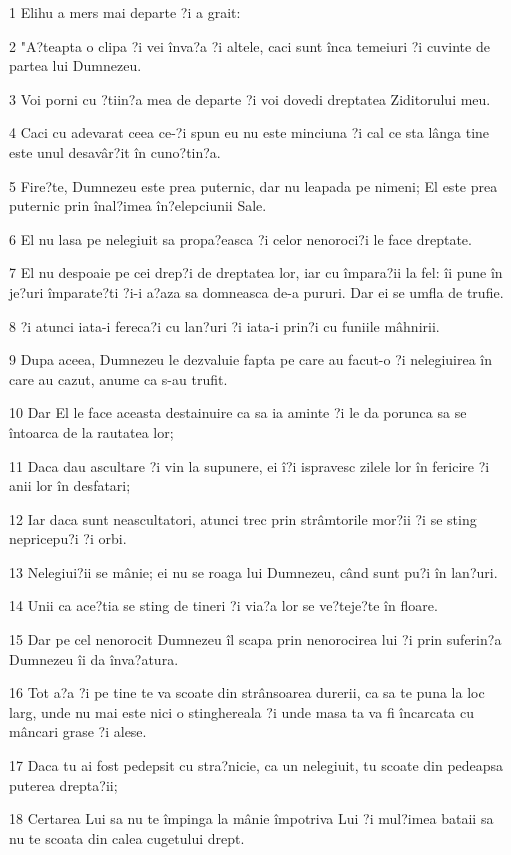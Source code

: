 \par 1 Elihu a mers mai departe ?i a grait:
\par 2 "A?teapta o clipa ?i vei înva?a ?i altele, caci sunt înca temeiuri ?i cuvinte de partea lui Dumnezeu.
\par 3 Voi porni cu ?tiin?a mea de departe ?i voi dovedi dreptatea Ziditorului meu.
\par 4 Caci cu adevarat ceea ce-?i spun eu nu este minciuna ?i cal ce sta lânga tine este unul desavâr?it în cuno?tin?a.
\par 5 Fire?te, Dumnezeu este prea puternic, dar nu leapada pe nimeni; El este prea puternic prin înal?imea în?elepciunii Sale.
\par 6 El nu lasa pe nelegiuit sa propa?easca ?i celor nenoroci?i le face dreptate.
\par 7 El nu despoaie pe cei drep?i de dreptatea lor, iar cu împara?ii la fel: îi pune în je?uri împarate?ti ?i-i a?aza sa domneasca de-a pururi. Dar ei se umfla de trufie.
\par 8 ?i atunci iata-i fereca?i cu lan?uri ?i iata-i prin?i cu funiile mâhnirii.
\par 9 Dupa aceea, Dumnezeu le dezvaluie fapta pe care au facut-o ?i nelegiuirea în care au cazut, anume ca s-au trufit.
\par 10 Dar El le face aceasta destainuire ca sa ia aminte ?i le da porunca sa se întoarca de la rautatea lor;
\par 11 Daca dau ascultare ?i vin la supunere, ei î?i ispravesc zilele lor în fericire ?i anii lor în desfatari;
\par 12 Iar daca sunt neascultatori, atunci trec prin strâmtorile mor?ii ?i se sting nepricepu?i ?i orbi.
\par 13 Nelegiui?ii se mânie; ei nu se roaga lui Dumnezeu, când sunt pu?i în lan?uri.
\par 14 Unii ca ace?tia se sting de tineri ?i via?a lor se ve?teje?te în floare.
\par 15 Dar pe cel nenorocit Dumnezeu îl scapa prin nenorocirea lui ?i prin suferin?a Dumnezeu îi da înva?atura.
\par 16 Tot a?a ?i pe tine te va scoate din strânsoarea durerii, ca sa te puna la loc larg, unde nu mai este nici o stinghereala ?i unde masa ta va fi încarcata cu mâncari grase ?i alese.
\par 17 Daca tu ai fost pedepsit cu stra?nicie, ca un nelegiuit, tu scoate din pedeapsa puterea drepta?ii;
\par 18 Certarea Lui sa nu te împinga la mânie împotriva Lui ?i mul?imea bataii sa nu te scoata din calea cugetului drept.

